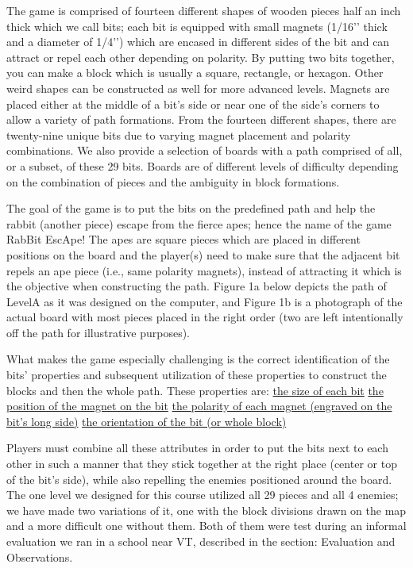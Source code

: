 \documentclass{acm_proc_article-sp}
\begin{document}
The game is comprised of fourteen different shapes of wooden pieces half an inch thick which we call bits; each bit is equipped with small magnets (1/16’’ thick and a diameter of 1/4’’) which are encased in different sides of the bit and can attract or repel each other depending on polarity. By putting two bits together, you can make a block which is usually a square, rectangle, or hexagon. Other weird shapes can be constructed as well for more advanced levels. Magnets are placed either at the middle of a bit’s side or near one of the side’s corners to allow a variety of path formations. From the fourteen different shapes, there are twenty-nine unique bits due to varying magnet placement and polarity combinations. We also provide a selection of boards with a path comprised of all, or a subset, of these 29 bits. Boards are of different levels of difficulty depending on the combination of pieces and the ambiguity in block formations.

The goal of the game is to put the bits on the predefined path and help the rabbit (another piece) escape from the fierce apes; hence the name of the game RabBit EscApe! The apes are square pieces which are placed in different positions on the board and the player(s) need to make sure that the adjacent bit repels an ape piece (i.e., same polarity magnets), instead of attracting it which is the objective when constructing the path. Figure 1a below depicts the path of LevelA as it was designed on the computer, and Figure 1b is a photograph of the actual board with most pieces placed in the right order (two are left intentionally off the path for illustrative purposes).

What makes the game especially challenging is the correct identification of the bits’ properties and subsequent utilization of these properties to construct the blocks and then the whole path. These properties are:
\ul{the size of each bit}
\ul{the position of the magnet on the bit}
\ul{the polarity of each magnet (engraved on the bit’s long side)}
\ul{the orientation of the bit (or whole block)}

Players must combine all these attributes in order to put the bits next to each other in such a manner that they stick together at the right place (center or top of the bit’s side), while also repelling the enemies positioned around the board. The one level we designed for this course utilized all 29 pieces and all 4 enemies; we have made two variations of it, one with the block divisions drawn on the map and a more difficult one without them. Both of them were test during an informal evaluation we ran in a school near VT, described in the section: Evaluation and Observations.
\end{document}
